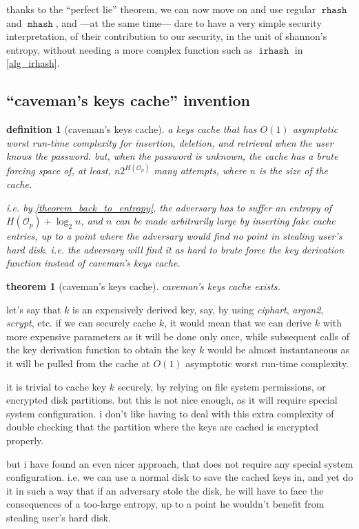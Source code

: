 \documentclass[twocolumn]{article}
\newtheorem{definition}{definition}[section]
\newtheorem{theorem}{theorem}[section]
\DeclareMathOperator{\rhash}{\mathtt{rhash}}
\DeclareMathOperator{\mhash}{\mathtt{mhash}}
\DeclareMathOperator{\irhash}{\mathtt{irhash}}
\begin{document}
thanks to the ``perfect lie'' theorem, we can now move on and use regular
$\rhash$ and $\mhash$, and ---at the same time--- dare to have a very
simple security interpretation, of their contribution to our security, in
the unit of shannon's entropy, without needing a more complex function such
as $\irhash$ in \cref{alg_irhash}.

\subsection{``caveman's keys cache'' invention}
\begin{definition}[caveman's keys cache]
    a keys cache that has $O(1)$ asymptotic worst run-time complexity for
    insertion, deletion, and retrieval when the user knows the password.
    but, when the password is unknown, the cache has a brute forcing space
    of, at least, $n2^{H(\mathcal{O}_p)}$ many attempts, where $n$ is the
    size of the cache.

    i.e. by \cref{theorem_back_to_entropy}, the adversary has to suffer an
    entropy of $H(\mathcal{O}_p) + \log_2 n$, and $n$ can be made
    arbitrarily large by inserting fake cache entries, up to a point where
    the adversary would find no point in stealing user's hard disk.  i.e.
    the adversary will find it as hard to brute force the key derivation
    function instead of caveman's keys cache.
\end{definition}
\begin{theorem}[caveman's keys cache]\label{theorem_cavemans_keys_cache}
   caveman's keys cache exists.
\end{theorem}

let's say that $k$ is an expensively derived key, say, by using
\emph{ciphart}, \emph{argon2}, \emph{scrypt}, etc.  if we can securely
cache $k$, it would mean that we can derive $k$ with more expensive
parameters as it will be done only once, while subsequent calls of the key
derivation function to obtain the key $k$ would be almost instantaneous as
it will be pulled from the cache at $O(1)$ asymptotic worst run-time
complexity.

it is trivial to cache key $k$ securely, by relying on file system
permissions, or encrypted disk partitions.  but this is not nice enough, as
it will require special system configuration.  i don't like having to deal
with this extra complexity of double checking that the partition where the
keys are cached is encrypted properly.  

but i have found an even nicer approach, that does not require any special
system configuration.  i.e. we can use a normal disk to save the cached
keys in, and yet do it in such a way that if an adversary stole the disk,
he will have to face the consequences of a too-large entropy, up to a point
he wouldn't benefit from stealing user's hard disk.
\end{document}
